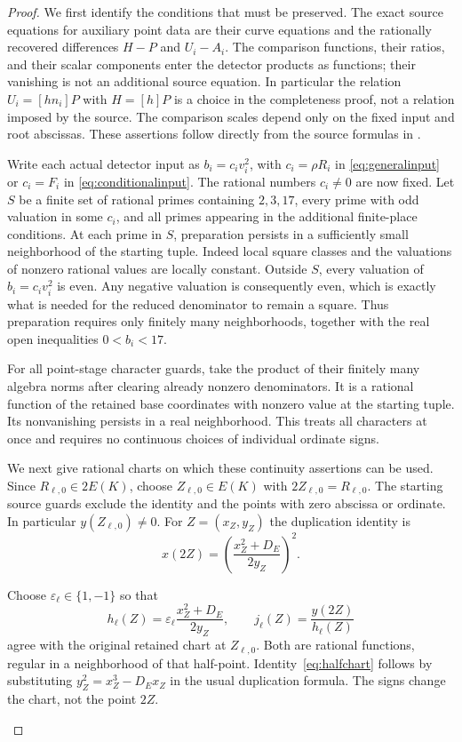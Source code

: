 \documentclass[11pt,a4paper]{article}
\theoremstyle{remark}\newtheorem{remark}[theorem]{Remark}
\begin{document}
\begin{proof}
We first identify the conditions that must be preserved. The exact
source equations for auxiliary point data are their curve equations
and the rationally recovered differences $H-P$ and $U_i-A_i$.
The comparison functions, their ratios, and their scalar components
enter the detector products as functions; their vanishing is not an
additional source equation. In particular the relation
$U_i=[hn_i]P$ with $H=[h]P$ is a choice in the completeness proof,
not a relation imposed by the source. The comparison scales depend
only on the fixed input and root abscissas. These assertions follow
directly from the source formulas in \cite[Sections 3--5]{UnitNorm}.

Write each actual detector input as $b_i=c_i v_i^2$, with
$c_i=\rho R_i$ in \eqref{eq:generalinput} or $c_i=F_i$ in
\eqref{eq:conditionalinput}. The rational numbers $c_i\ne0$ are
now fixed. Let $S$ be a finite set of rational primes containing
$2,3,17$, every prime with odd valuation in some $c_i$, and all
primes appearing in the additional finite-place conditions. At
each prime in $S$, preparation persists in a sufficiently small
neighborhood of the starting tuple. Indeed local square classes and
the valuations of nonzero rational values are locally constant.
Outside $S$, every valuation of $b_i=c_iv_i^2$ is even. Any negative
valuation is consequently even, which is exactly what is needed
for the reduced denominator to remain a square. Thus preparation
requires only finitely many neighborhoods, together with the real
open inequalities $0<b_i<17$.

For all point-stage character guards, take the product of their
finitely many algebra norms after clearing already nonzero
denominators. It is a rational function of the retained base
coordinates with nonzero value at the starting tuple. Its
nonvanishing persists in a real neighborhood. This treats all
characters at once and requires no continuous choices of individual
ordinate signs.

We next give rational charts on which these continuity assertions
can be used. Since $R_{\ell,0}\in2E(K)$, choose
$Z_{\ell,0}\in E(K)$ with $2Z_{\ell,0}=R_{\ell,0}$. The
starting source guards exclude the identity and the points with
zero abscissa or ordinate. In particular $y(Z_{\ell,0})\ne0$.
For $Z=(x_Z,y_Z)$ the duplication identity is
\begin{equation}\label{eq:halfchart}
 x(2Z)=\left(\frac{x_Z^2+D_E}{2y_Z}\right)^2.
\end{equation}
\begin{samepage}
Choose $\varepsilon_\ell\in\{1,-1\}$ so that
\[
 h_\ell(Z)=\varepsilon_\ell\frac{x_Z^2+D_E}{2y_Z},\qquad
 j_\ell(Z)=\frac{y(2Z)}{h_\ell(Z)}
\]
agree with the original retained chart at $Z_{\ell,0}$.
Both are rational functions, regular in a neighborhood of that
half-point. Identity~\eqref{eq:halfchart} follows by substituting
$y_Z^2=x_Z^3-D_E x_Z$ in the usual duplication formula.
The signs change the chart, not the point $2Z$.
\end{samepage}


\end{proof}
\end{document}
